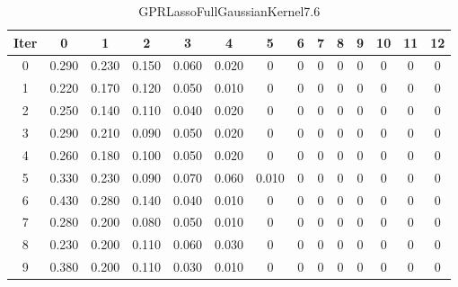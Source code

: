 \begin{table}
	\begin{center}
		\begin{tabular}{|c|c|c|c|c|c|c|c|c|c|c|c|c|c|}
			\hline
			Iter & 0 & 1 & 2 & 3 & 4 & 5 & 6 & 7 & 8 & 9 & 10 & 11 & 12 \\
			\hline
			0 & 0.290 & 0.230 & 0.150 & 0.060 & 0.020 & 0 & 0 & 0 & 0 & 0 & 0 & 0 & 0 \\
			\hline
			1 & 0.220 & 0.170 & 0.120 & 0.050 & 0.010 & 0 & 0 & 0 & 0 & 0 & 0 & 0 & 0 \\
			\hline
			2 & 0.250 & 0.140 & 0.110 & 0.040 & 0.020 & 0 & 0 & 0 & 0 & 0 & 0 & 0 & 0 \\
			\hline
			3 & 0.290 & 0.210 & 0.090 & 0.050 & 0.020 & 0 & 0 & 0 & 0 & 0 & 0 & 0 & 0 \\
			\hline
			4 & 0.260 & 0.180 & 0.100 & 0.050 & 0.020 & 0 & 0 & 0 & 0 & 0 & 0 & 0 & 0 \\
			\hline
			5 & 0.330 & 0.230 & 0.090 & 0.070 & 0.060 & 0.010 & 0 & 0 & 0 & 0 & 0 & 0 & 0 \\
			\hline
			6 & 0.430 & 0.280 & 0.140 & 0.040 & 0.010 & 0 & 0 & 0 & 0 & 0 & 0 & 0 & 0 \\
			\hline
			7 & 0.280 & 0.200 & 0.080 & 0.050 & 0.010 & 0 & 0 & 0 & 0 & 0 & 0 & 0 & 0 \\
			\hline
			8 & 0.230 & 0.200 & 0.110 & 0.060 & 0.030 & 0 & 0 & 0 & 0 & 0 & 0 & 0 & 0 \\
			\hline
			9 & 0.380 & 0.200 & 0.110 & 0.030 & 0.010 & 0 & 0 & 0 & 0 & 0 & 0 & 0 & 0 \\
			\hline
		\end{tabular}
	\end{center}
	\caption{GPRLassoFullGaussianKernel7.6}
\end{table}
